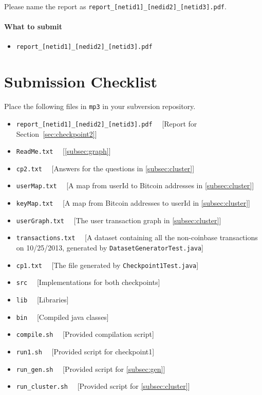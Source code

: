 \documentclass[letterpaper,12pt]{report}
\begin{document}
Please name the report as \texttt{report\_[netid1]\_[nedid2]\_[netid3].pdf}.

\paragraph{What to submit} \label{para: submit}
\begin{itemize}
	\item \texttt{report\_[netid1]\_[nedid2]\_[netid3].pdf}
\end{itemize} 

\section*{Submission Checklist} \label{para:submission}
Place the following files in \texttt{mp3} in your subversion repository. 

\medskip

\begin{itemize}
	
	\item \texttt{report\_[netid1]\_[nedid2]\_[netid3].pdf} \ \ [Report for Section~\ref{sec:checkpoint2}] 
	\item \texttt{ReadMe.txt} \ \ [\ref{subsec:graph}]
	\item \texttt{cp2.txt} \ \ [Answers for the questions in \ref{subsec:cluster}]
	\item \texttt{userMap.txt} \ \ [A map from userId to Bitcoin addresses in \ref{subsec:cluster}]
	\item \texttt{keyMap.txt} \ \ [A map from Bitcoin addresses to userId in \ref{subsec:cluster}]
	\item \texttt{userGraph.txt} \ \ [The user transaction graph in \ref{subsec:cluster}]
	\item \texttt{transactions.txt} \ \  [A dataset containing all the non-coinbase transactions on 10/25/2013, generated by \texttt{DatasetGeneratorTest.java}]
	\item \texttt{cp1.txt} \ \  [The file generated by \texttt{Checkpoint1Test.java}]
	\item \texttt{src} \ \ [Implementations for both checkpoints]
	\item \texttt{lib} \ \ [Libraries]
	\item \texttt{bin} \ \ [Compiled java classes]
	\item \texttt{compile.sh} \ \ [Provided compilation script]
	\item \texttt{run1.sh} \ \ [Provided script for checkpoint1]
	\item \texttt{run\_gen.sh} \ \ [Provided script for \ref{subsec:gen}]
	\item \texttt{run\_cluster.sh} \ \ [Provided script for \ref{subsec:cluster}]
\end{itemize}
\end{document}
